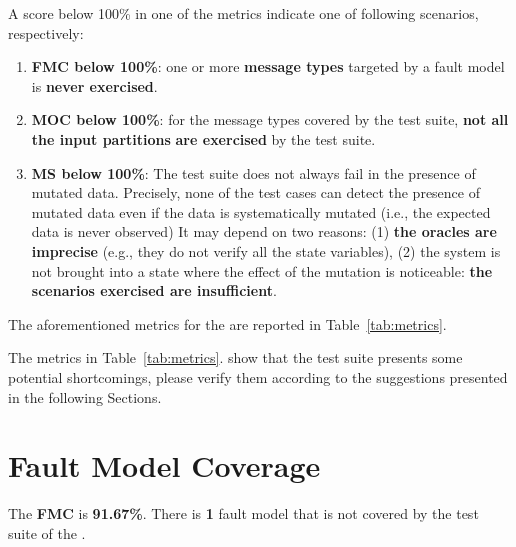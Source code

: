 A score below 100\% in one of the metrics indicate one of following scenarios, respectively:
\begin{enumerate}
\item \textbf{FMC below 100\%}: one or more \textbf{message types} targeted by a fault model is \textbf{never exercised}.
\item \textbf{MOC below 100\%}: for the message types covered by the test suite, \textbf{not all the input partitions} \textbf{are exercised} by the test suite.
\item \textbf{MS below 100\%}: The test suite does not always fail in the presence of mutated data. Precisely, none of the test cases can detect the presence of mutated data even if the data is systematically mutated (i.e., the expected data is never observed) It may depend on two reasons: (1) \textbf{the oracles are imprecise} (e.g., they do not verify all the state variables), (2) the system is not brought into a state where the effect of the mutation is noticeable: \textbf{the scenarios exercised are insufficient}.
\end{enumerate}

The aforementioned metrics for the \case are reported in Table~\ref{tab:metrics}.





\action The metrics in Table~\ref{tab:metrics}. show that the test suite presents some potential shortcomings, please verify them according to the suggestions presented in the following Sections.

\section{Fault Model Coverage}

The \textbf{FMC} is \textbf{91.67\%}. There is \textbf{1} fault model that is not covered by the test suite of the \case.

